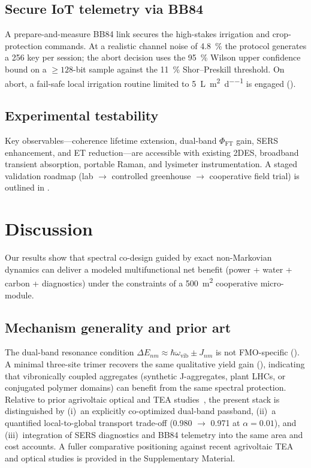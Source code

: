 \documentclass[preprint,12pt]{elsarticle}
\begin{document}
\subsection{Secure IoT telemetry via BB84}
A prepare-and-measure BB84 link secures the high-stakes irrigation and crop-protection commands. At a realistic channel noise of \qty{4.8}{\percent} the protocol generates a \qty{256}{\bit} key per session; the abort decision uses the \qty{95}{\percent} Wilson upper confidence bound on a $\geq 128$-bit sample against the \qty{11}{\percent} Shor--Preskill threshold. On abort, a fail-safe local irrigation routine limited to \qty{5}{\L\per\m\squared\per\day} is engaged ().

\subsection{Experimental testability}
Key observables---coherence lifetime extension, dual-band $\Phi_{\mathrm{FT}}$ gain, SERS enhancement, and ET reduction---are accessible with existing 2DES, broadband transient absorption, portable Raman, and lysimeter instrumentation. A staged validation roadmap (lab $\to$ controlled greenhouse $\to$ cooperative field trial) is outlined in .

\section{Discussion}

Our results show that spectral co-design guided by exact non-Markovian dynamics can deliver a modeled multifunctional net benefit (power + water + carbon + diagnostics) under the constraints of a \qty{500}{\m\squared} cooperative micro-module.

\subsection{Mechanism generality and prior art}
The dual-band resonance condition $\Delta E_{nm} \approx \hbar\omega_{\mathrm{vib}} \pm J_{nm}$ is not FMO-specific (). A minimal three-site trimer recovers the same qualitative yield gain (), indicating that vibronically coupled aggregates (synthetic J-aggregates, plant LHCs, or conjugated polymer domains) can benefit from the same spectral protection. Relative to prior agrivoltaic optical and TEA studies~\cite{Valle2017,Amaducci2018,Mahim2025,Ravilla2024,Bellone2024}, the present stack is distinguished by (i)~an explicitly co-optimized dual-band passband, (ii)~a quantified local-to-global transport trade-off (\num{0.980} $\to$ \num{0.971} at $\alpha=0.01$), and (iii)~integration of SERS diagnostics and BB84 telemetry into the same area and cost accounts. A fuller comparative positioning against recent agrivoltaic TEA and optical studies is provided in the Supplementary Material.
\end{document}

